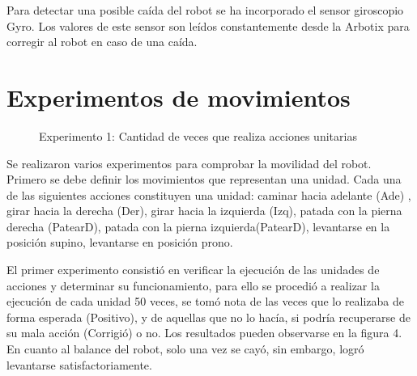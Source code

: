 \documentclass[conference, letterpaper]{IEEEtranMC1}
\begin{document}
Para detectar una posible caída del robot se ha incorporado el sensor giroscopio Gyro. Los valores de este sensor son leídos constantemente desde la Arbotix para corregir al robot en caso de una caída.  

\section{Experimentos de movimientos }
\label{sec:experimento}

\begin{figure}
\label{fig:experimento1}

\caption{Experimento 1: Cantidad de veces que realiza acciones unitarias}
\end{figure}
Se realizaron varios experimentos para comprobar la movilidad del robot. Primero se debe definir los movimientos que representan una unidad. Cada una de las siguientes acciones constituyen una unidad: caminar hacia adelante (Ade) , girar hacia la derecha (Der), girar hacia la izquierda (Izq), patada con la pierna derecha (PatearD), patada con la pierna izquierda(PatearD), levantarse en la posición supino, levantarse en posición prono.

El primer experimento consistió en verificar la ejecución de las unidades de acciones y determinar su funcionamiento, para ello se procedió a realizar la ejecución de cada unidad 50 veces, se tomó nota de las veces que lo realizaba de forma esperada (Positivo), y de aquellas que no lo hacía, si podría recuperarse de su mala acción (Corrigió) o no. Los resultados pueden observarse en la figura 4. En cuanto al balance del robot,  solo una vez se cayó, sin embargo, logró levantarse satisfactoriamente.
\end{document}
